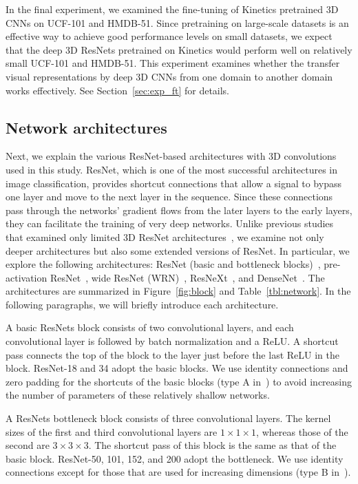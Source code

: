 \documentclass[10pt,twocolumn,letterpaper]{article}
\begin{document}
    In the final experiment, we examined the fine-tuning of Kinetics pretrained 3D CNNs on UCF-101 and HMDB-51.
    Since pretraining on large-scale datasets is an effective way to achieve good performance levels on small datasets,
    we expect that the deep 3D ResNets pretrained on Kinetics would perform well on relatively small UCF-101 and HMDB-51.
    This experiment examines 
    whether the transfer visual representations by deep 3D CNNs from one domain to another domain works effectively.
    See Section~\ref{sec:exp_ft} for details.

  \subsection{Network architectures}
    Next, we explain the various ResNet-based architectures with 3D convolutions used in this study.
    ResNet, which is one of the most successful architectures in image classification,
    provides shortcut connections that allow a signal to bypass one layer and move to the next layer in the sequence.
    Since these connections pass through the networks' gradient flows from the later layers to the early layers,
    they can facilitate the training of very deep networks.
    Unlike previous studies that examined only limited 3D ResNet architectures~\cite{Hara_2017_ICCV_Workshops,res3d},
    we examine not only deeper architectures but also some extended versions of ResNet.
    In particular, we explore the following architectures:
    ResNet (basic and bottleneck blocks)~\cite{ResNet},
    pre-activation ResNet~\cite{He2016}, wide ResNet (WRN)~\cite{WideResNet},
    ResNeXt~\cite{resnext}, and DenseNet~\cite{densenets}.
    The architectures are summarized in Figure~\ref{fig:block} and Table~\ref{tbl:network}.
    In the following paragraphs, we will briefly introduce each architecture.

    A basic ResNets block consists of two convolutional layers, and
    each convolutional layer is followed by batch normalization and a ReLU.\@
    A shortcut pass connects the top of the block to the layer just before the last ReLU in the block.
    ResNet-18 and 34 adopt the basic blocks.
    We use identity connections and zero padding for the shortcuts of the basic blocks (type A in~\cite{ResNet})
    to avoid increasing the number of parameters of these relatively shallow networks.

    A ResNets bottleneck block consists of three convolutional layers.
    The kernel sizes of the first and third convolutional layers are \(1 \times 1 \times 1\),
    whereas those of the second are \(3 \times 3 \times 3\).
    The shortcut pass of this block is the same as that of the basic block.
    ResNet-50, 101, 152, and 200 adopt the bottleneck.
    We use identity connections except for those that are used for increasing dimensions (type B in~\cite{ResNet}).
\end{document}
